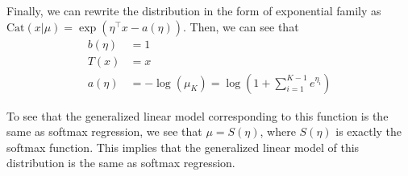 \documentclass[12pt,letterpaper,fleqn]{hmcpset}
\begin{document}
\begin{solution}
Finally, we can rewrite the distribution in the form of exponential family as $\text{Cat}(x|\mu) = \exp(\eta^\top x - a(\eta))$. Then, we can see that
\begin{align*}
b(\eta) &= 1 \\
T(x) &= x \\
a(\eta) &= -\log(\mu_K) = \log \left( 1 + \sum_{i=1}^{K-1} e^{\eta_i} \right)
\end{align*}

To see that the generalized linear model corresponding to this function is the same as softmax regression, we see that $\mu = S(\eta)$, where $S(\eta)$ is exactly the softmax function. This implies that the generalized linear model of this distribution is the same as softmax regression.


\end{solution}
\newpage
\end{document}
